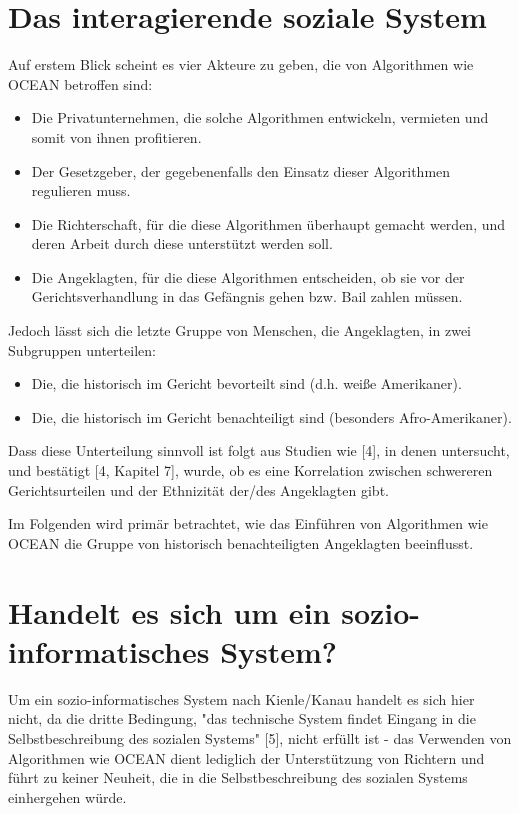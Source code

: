 \documentclass[10pt, a4paper, twocolumn]{article} %
\begin{document}
\section{Das interagierende soziale System}
Auf erstem Blick scheint es vier Akteure zu geben, die von Algorithmen wie OCEAN betroffen sind:
\begin{itemize}
  \item Die Privatunternehmen, die solche Algorithmen entwickeln, vermieten und somit von ihnen profitieren.
  \item Der Gesetzgeber, der gegebenenfalls den Einsatz dieser Algorithmen regulieren muss.
  \item Die Richterschaft, für die diese Algorithmen überhaupt gemacht werden, und deren Arbeit durch diese unterstützt werden soll.
  \item Die Angeklagten, für die diese Algorithmen entscheiden, ob sie vor der Gerichtsverhandlung in das Gefängnis gehen bzw. Bail zahlen müssen.
\end{itemize}
Jedoch lässt sich die letzte Gruppe von Menschen, die Angeklagten, in zwei Subgruppen unterteilen: 
\begin{itemize}
  \item Die, die historisch im Gericht bevorteilt sind (d.h. weiße Amerikaner).
  \item Die, die historisch im Gericht benachteiligt sind (besonders Afro-Amerikaner).
\end{itemize}
Dass diese Unterteilung sinnvoll ist folgt aus Studien wie [4], in denen untersucht, und bestätigt [4, Kapitel 7], wurde, ob es eine Korrelation zwischen schwereren Gerichtsurteilen und der Ethnizität der/des Angeklagten gibt.

Im Folgenden wird primär betrachtet, wie das Einführen von Algorithmen wie OCEAN die Gruppe von historisch benachteiligten Angeklagten beeinflusst.

\section{Handelt es sich um ein sozio-informatisches System?}
Um ein sozio-informatisches System nach Kienle/Kanau handelt es sich hier nicht, da die dritte Bedingung, "das technische System findet Eingang in die Selbstbeschreibung des sozialen Systems" [5], nicht erfüllt ist - das Verwenden von Algorithmen wie OCEAN dient lediglich der Unterstützung von Richtern und führt zu keiner Neuheit, die in die Selbstbeschreibung des sozialen Systems einhergehen würde.
\end{document}
